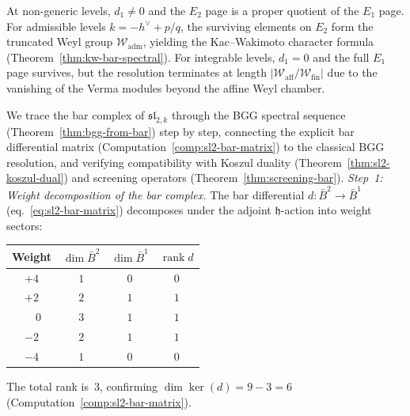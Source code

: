 \begin{remark}\label{rem:bgg-special}
At non-generic levels, $d_1 \neq 0$ and the $E_2$ page is a
proper quotient of the $E_1$ page.  For admissible levels
$k = -h^\vee + p/q$, the surviving elements on $E_2$ form
the truncated Weyl group $\mathcal{W}_{\mathrm{adm}}$,
yielding the Kac--Wakimoto character formula
(Theorem~\ref{thm:kw-bar-spectral}).  For integrable levels,
$d_1 = 0$ and the full $E_1$ page survives, but the
resolution terminates at length
$|\mathcal{W}_{\mathrm{aff}}/\mathcal{W}_{\mathrm{fin}}|$
due to the vanishing of the Verma modules beyond the
affine Weyl chamber.
\end{remark}

\begin{computation}
\label{comp:bgg-sl2-pipeline}
We trace the bar complex of $\widehat{\mathfrak{sl}}_{2,k}$ through
the BGG spectral sequence (Theorem~\ref{thm:bgg-from-bar}) step by
step, connecting the explicit bar differential matrix
(Computation~\ref{comp:sl2-bar-matrix}) to the classical BGG
resolution, and verifying compatibility with Koszul duality
(Theorem~\ref{thm:sl2-koszul-dual}) and screening operators
(Theorem~\ref{thm:screening-bar}).  \emph{Step~1: Weight decomposition of the bar complex.}
The bar differential $d\colon \bar{B}^2 \to \bar{B}^1$
(eq.~\eqref{eq:sl2-bar-matrix}) decomposes under the adjoint
$\mathfrak{h}$-action into weight sectors:
\begin{center}
\renewcommand{\arraystretch}{1.2}
\begin{tabular}{cccc}
\textbf{Weight} & $\dim \bar{B}^2$ & $\dim \bar{B}^1$
  & $\operatorname{rank} d$ \\
\hline
$+4$ & $1$ & $0$ & $0$ \\
$+2$ & $2$ & $1$ & $1$ \\
$\phantom{+}0$ & $3$ & $1$ & $1$ \\
$-2$ & $2$ & $1$ & $1$ \\
$-4$ & $1$ & $0$ & $0$
\end{tabular}
\end{center}
The total rank is~$3$, confirming
$\dim \ker(d) = 9 - 3 = 6$
(Computation~\ref{comp:sl2-bar-matrix}).


\end{computation}
